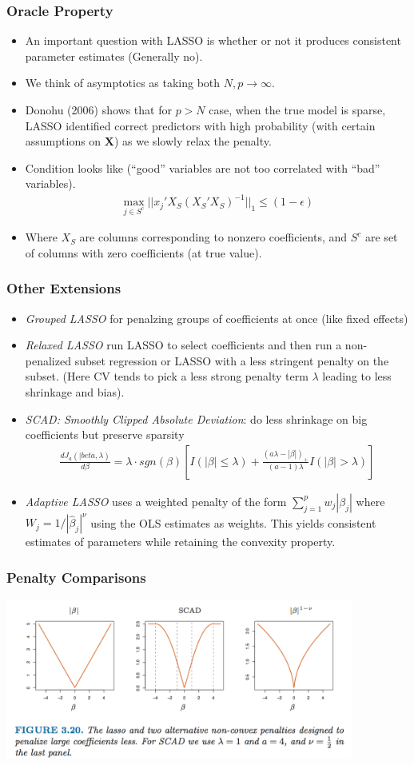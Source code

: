 \documentclass[xcolor=pdftex,dvipsnames,table,mathserif,aspectratio=169]{beamer}
\begin{document}
\begin{frame}
\frametitle{Oracle Property}
\begin{itemize}
\item An important question with LASSO is whether or not it produces consistent parameter estimates (Generally \alert{no}).
\item We think of asymptotics as taking both $N,p\rightarrow \infty$.
\item Donohu (2006) shows that for $p > N$ case, when the true model is sparse, LASSO identified correct predictors with high probability (with certain assumptions on $\mathbf{X}$) as we slowly relax the penalty.
\item Condition looks like (``good'' variables are not too correlated with ``bad'' variables).
\begin{eqnarray*}
\max_{j \in S^{c}} || x_j' X_{S} (X_{S}' X_{S})^{-1} ||_{1} \leq (1 -\epsilon) 
\end{eqnarray*}
\item Where $X_{S}$ are columns corresponding to nonzero coefficients, and $S^{c}$ are set of columns with zero coefficients (at true value).
\end{itemize}
\end{frame}


\begin{frame}
\frametitle{Other Extensions}
\begin{itemize}
\item \textit{Grouped LASSO} for penalzing groups of coefficients at once (like fixed effects)
\item \textit{Relaxed LASSO} run LASSO to select coefficients and then run a non-penalized subset regression or LASSO with a less stringent penalty on the subset. (Here CV tends to pick a less strong penalty term $\lambda$ leading to less shrinkage and bias).
\item \textit{SCAD: Smoothly Clipped Absolute Deviation}: do less shrinkage on big coefficients but preserve sparsity
\begin{eqnarray*}
\frac{ d J_a(|beta,\lambda)}{d \beta} = \lambda \cdot sgn(\beta) \left[ I(| \beta| \leq \lambda) + \frac{(a \lambda - | \beta|)_{+}}{(a-1) \lambda} I (| \beta| > \lambda) \right]
\end{eqnarray*}
\item \textit{Adaptive LASSO} uses  a weighted penalty of the form $\sum_{j=1}^p w_j |\beta_j|$ where $W_j = 1/|\hat{\beta}_j|^{\nu}$ using the OLS estimates as weights. This yields consistent estimates of parameters while retaining the convexity property.
\end{itemize}
\end{frame}

\begin{frame}
\frametitle{Penalty Comparisons}
\begin{center}
\includegraphics[width=4.5in]{./resources/lassopenalty}
\end{center}
\end{frame}
\end{document}
